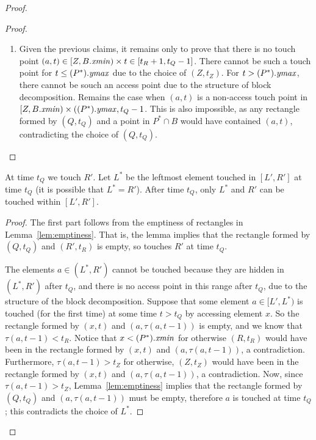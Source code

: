 \begin{proof}
\begin{proof}
\begin{enumerate}[label={{(}\roman*{)}}]
\item
Given the previous claims, it remains only to prove that there is no touch point $(a,t) \in [Z, B.\mathit{xmin}) \times t \in [t_R+1, t_Q-1]$.
There cannot be such a touch point for $t \leq (P^*).\mathit{ymax}$ due to the choice of $(Z,t_Z)$. For $t > (P^*).\mathit{ymax}$, there cannot be souch an access point due to the structure of block decomposition. Remains the case when $(a,t)$ is a non-access touch point in $[Z,B.\mathit{xmin}) \times ((P^*).\mathit{ymax}, t_Q-1$. This is also impossible, as any rectangle formed by $(Q,t_Q)$ and a point in $P^* \cap B$ would have contained $(a,t)$, contradicting the choice of $(Q,t_Q)$. 

\end{enumerate} 
\end{proof}


\begin{lemma}
\label{lem:d8}
At time $t_Q$ %
we touch $R'$. Let $L^*$ be the leftmost element touched in $[L',R']$ at time $t_Q$ (it is possible that $L^* = R'$). After time $t_Q$, only $L^*$ and $R'$ can be touched within $[L',R']$. 
\end{lemma}
\begin{proof}
The first part follows from the emptiness of rectangles in Lemma~\ref{lem:emptiness}.
That is, the lemma implies that the rectangle formed by $(Q,t_Q)$ and $(R', t_R)$ is empty, so \greedy touches $R'$ at time $t_Q$.  

The elements $a \in (L^*, R')$ cannot be touched because they are hidden in $(L^*,R')$ after $t_Q$, and there is no access point in this range after $t_Q$, due to the structure of the block decomposition.
Suppose that some element $a \in [L', L^*)$ is touched (for the first time) at some time $t > t_Q$ by accessing element $x$. 
So the rectangle formed by $(x,t)$ and $(a,\tau(a,t-1))$ is empty, and we know that $\tau(a,t-1) < t_R$. Notice that $x<(P^*).\mathit{xmin}$ for otherwise $(R,t_R)$ would have been in the rectangle formed by $(x,t)$ and $(a,\tau(a,t-1))$, a contradiction.
Furthermore, $\tau(a,t-1) > t_Z$ for otherwise, $(Z,t_Z)$ would have been in the rectangle formed by $(x,t)$ and $(a,\tau(a,t-1))$, a contradiction. 
Now, since $\tau(a,t-1) > t_Z$, Lemma~\ref{lem:emptiness} implies that the rectangle formed by $(Q,t_Q)$ and $(a,\tau(a,t-1))$ must be empty, therefore $a$ is touched at time $t_Q$; this contradicts the choice of $L^*$. 


\end{proof}
\end{proof}
